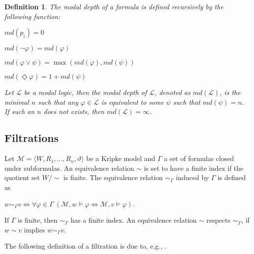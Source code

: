 \documentclass[a4paper]{article}
\theoremstyle{defin}
\newtheorem{defin}{Definition}
\theoremstyle{theorem}
\theoremstyle{prop}
\theoremstyle{lemma}
\theoremstyle{fact}
\theoremstyle{exercise}
\theoremstyle{ex}
\theoremstyle{col}
\theoremstyle{claim}
\begin{document}
\begin{defin}
The modal depth of a formula is defined recursively by the following function:
\begin{center}
  $md(p_i) = 0$

  $md(\neg \varphi) = md(\varphi)$

  $md(\varphi \lor \psi) = \max(md(\varphi), md(\psi))$

  $md(\Diamond \varphi) = 1 + md(\psi)$
\end{center}

Let $\mathcal{L}$ be a modal logic, then the modal depth of $\mathcal{L}$, denoted as $md(\mathcal{L})$, is the minimal $n$ such that any $\varphi \in \mathcal{L}$ is equivalent to some $\psi$ such that $md(\psi) = n$. If such an $n$ does not exists, then $md(\mathcal{L}) = \infty$.
\end{defin}

\subsection{Filtrations}

Let $\mathcal{M} = \langle W, R_1, \dots, R_n, \vartheta \rangle$ be a Kripke model and $\Gamma$ a set of formulas closed under subformulas. An equivalence relation $\sim$ is set to have a finite index if the quotient set $W / \sim$ is finite. The equivalence relation $\sim_{\Gamma}$ induced by $\Gamma$ is defined as

\begin{center}
  $w \sim_{\Gamma} v \Leftrightarrow \forall \varphi \in \Gamma \: (\mathcal{M}, w \models \varphi \Leftrightarrow \mathcal{M}, v \models \varphi)$.
\end{center}

If $\Gamma$ is finite, then $\sim_{\Gamma}$ has a finite index. An equivalence relation $\sim$ respects $\sim_{\Gamma}$, if $w \sim v$ implies $w \sim_{\Gamma} v$.

The following definition of a filtration is due to, e.g., \cite{shehtman2004filtration}.
\end{document}
